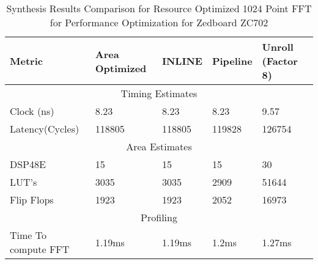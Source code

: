 \begin{table}[!h]
\centering
\caption{Synthesis Results Comparison for Resource Optimized 1024 Point FFT for Performance Optimization for Zedboard ZC702}
\label{Table 4.2}
\begin{tabular}{||m{4cm}|m{2.5cm}|m{2.5cm}|m{2.5cm}|m{2.5cm}||}
\hline
Metric & Area Optimized & INLINE & Pipeline & Unroll (Factor 8)\\
\hline
\multicolumn{5}{||c||}{Timing Estimates}\\
\hline
Clock (ns)&8.23 &8.23&8.23& 9.57\\
\hline
Latency(Cycles) &118805 & 118805 &119828 &126754\\
\hline
\multicolumn{5}{||c||}{Area Estimates}\\
\hline
DSP48E & 15& 15 &15 & 30 \\
\hline
LUT's & 3035 & 3035 &2909 &51644\\
\hline
Flip Flops & 1923 & 1923 & 2052 &16973\\
\hline	
\multicolumn{5}{||c||}{Profiling}\\
\hline
Time To compute FFT &1.19ms&1.19ms&1.2ms&1.27ms\\
\hline
\end{tabular}

\end{table}